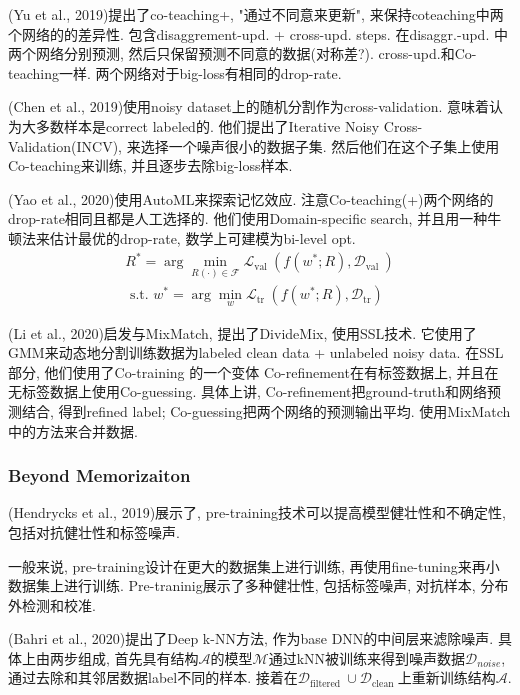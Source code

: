 \documentclass{article}
\begin{document}
(Yu  et  al., 2019)提出了co-teaching+, "通过不同意来更新", 来保持coteaching中两个网络的的差异性. 包含disaggrement-upd. + cross-upd. steps. 在disaggr.-upd. 中两个网络分别预测, 然后只保留预测不同意的数据(对称差?). cross-upd.和Co-teaching一样. 两个网络对于big-loss有相同的drop-rate.

(Chen et al., 2019)使用noisy dataset上的随机分割作为cross-validation. 意味着认为大多数样本是correct labeled的. 他们提出了Iterative Noisy Cross-Validation(INCV), 来选择一个噪声很小的数据子集. 然后他们在这个子集上使用Co-teaching来训练, 并且逐步去除big-loss样本.

(Yao et al., 2020)使用AutoML来探索记忆效应. 注意Co-teaching(+)两个网络的drop-rate相同且都是人工选择的. 他们使用Domain-specific search, 并且用一种牛顿法来估计最优的drop-rate, 数学上可建模为bi-level opt. 
\begin{equation}
    \begin{array}{l}
    R^{*}=\arg \min _{R(\cdot) \in \mathcal{F}} \mathcal{L}_{\text {val }}\left(f\left(w^{*} ; R\right), \mathcal{D}_{\text {val }}\right) \\
    \text { s.t. } w^{*}=\arg \min _{w} \mathcal{L}_{\text {tr }}\left(f\left(w^{*} ; R\right), \mathcal{D}_{\operatorname{tr}}\right)
    \end{array}
\end{equation}

(Li et al., 2020)启发与MixMatch, 提出了DivideMix, 使用SSL技术. 它使用了GMM来动态地分割训练数据为labeled clean data + unlabeled noisy data. 在SSL部分, 他们使用了Co-training 的一个变体 Co-refinement在有标签数据上, 并且在无标签数据上使用Co-guessing. 具体上讲, Co-refinement把ground-truth和网络预测结合, 得到refined label; Co-guessing把两个网络的预测输出平均. 使用MixMatch中的方法来合并数据.

\subsubsection{Beyond Memorizaiton}

(Hendrycks et al., 2019)展示了, pre-training技术可以提高模型健壮性和不确定性, 包括对抗健壮性和标签噪声. 

一般来说, pre-training设计在更大的数据集上进行训练, 再使用fine-tuning来再小数据集上进行训练. Pre-traninig展示了多种健壮性, 包括标签噪声, 对抗样本, 分布外检测和校准.

(Bahri et al., 2020)提出了Deep k-NN方法, 作为base DNN的中间层来滤除噪声. 具体上由两步组成, 首先具有结构$\mathcal A$的模型$\mathcal M$通过kNN被训练来得到噪声数据$\mathcal {D}_{noise}$, 通过去除和其邻居数据label不同的样本. 接着在$\mathcal{D}_{\text {filtered }} \cup \mathcal{D}_{\text {clean }}$上重新训练结构$\mathcal A$.
\end{document}
